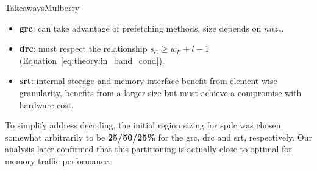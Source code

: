\begin{highlight}{Takeaways}{Mulberry}
    \begin{itemize}
        \item \textbf{\acrshort{grc}}: can take advantage of prefetching methods, size depends on $\mathit{nnz}_c$.
        \item \textbf{\acrshort{drc}}: must respect the relationship $s_C \geqslant w_B + l - 1$ (Equation~\ref{eq:theory:in_band_cond}).
        \item \textbf{\acrshort{srt}}: internal storage and memory interface benefit from element-wise granularity, benefits from a larger size but must achieve a compromise with hardware cost.
    \end{itemize}
    To simplify address decoding, the initial region sizing for \acrlong{spdc} was chosen somewhat arbitrarily to be \textbf{25/50/25\%} for the \acrshort{grc}, \acrshort{drc} and \acrshort{srt}, respectively.
    Our analysis later confirmed that this partitioning is actually close to optimal for memory traffic performance.
\end{highlight}

\clearpage